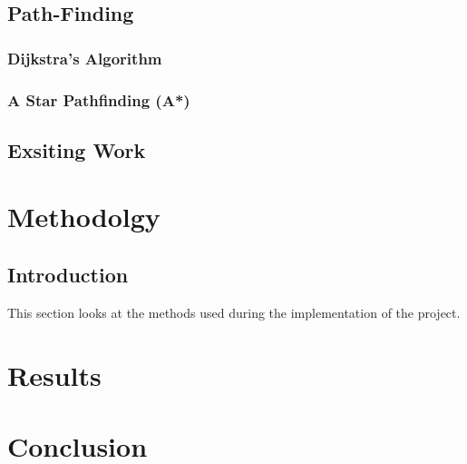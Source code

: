 \documentclass{article}
\begin{document}
\subsection{Path-Finding}
\subsubsection{Dijkstra’s Algorithm}
\subsubsection{A Star Pathfinding (A*)}
\subsection{Exsiting Work}
\section{Methodolgy}
\subsection{Introduction}
This section looks at the methods used during the implementation of the project. 
\section{Results}

\section{Conclusion}




\end{document}
